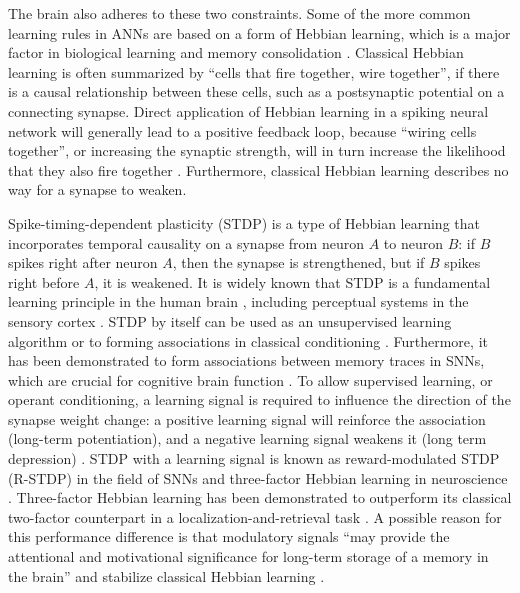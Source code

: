 The brain also adheres to these two constraints.
Some of the more common learning rules in ANNs are based on a form of Hebbian learning, which is a major factor in biological learning and memory consolidation \citep{schuman2017survey}.
Classical Hebbian learning is often summarized by ``cells that fire together, wire together'', if there is a causal relationship between these cells, such as a postsynaptic potential on a connecting synapse.
Direct application of Hebbian learning in a spiking neural network will generally lead to a positive feedback loop, because ``wiring cells together'', or increasing the synaptic strength, will in turn increase the likelihood that they also fire together \citep{zenke2017temporal}.
Furthermore, classical Hebbian learning describes no way for a synapse to weaken.

Spike-timing-dependent plasticity (STDP) \citep{abbott2000synaptic,caporale2008spike} is a type of Hebbian learning that incorporates temporal causality on a synapse from neuron $A$ to neuron $B$: if $B$ spikes right after neuron $A$, then the synapse is strengthened, but if $B$ spikes right before $A$, it is weakened.
It is widely known that STDP is a fundamental learning principle in the human brain \citep{kandel2000principles,caporale2008spike}, including perceptual systems in the sensory cortex \citep{huang2014associative}.
STDP by itself can be used as an unsupervised learning algorithm or to forming associations in classical conditioning \citep{diehl2015unsupervised,kim2018demonstration}.
Furthermore, it has been demonstrated to form associations between memory traces in SNNs, which are crucial for cognitive brain function \citep{pokorny2020stdp}.
To allow supervised learning, or operant conditioning, a learning signal is required to influence the direction of the synapse weight change: a positive learning signal will reinforce the association (long-term potentiation), and a negative learning signal weakens it (long term depression) \citep{lobov2020spatial}.
STDP with a learning signal is known as reward-modulated STDP (R-STDP) \citep{legenstein2008learning} in the field of SNNs and three-factor Hebbian learning in neuroscience \citep{fremaux2016neuromodulated}.
Three-factor Hebbian learning has been demonstrated to outperform its classical two-factor counterpart in a localization-and-retrieval task \citep{porr2007learning}.
A possible reason for this performance difference is that modulatory signals ``may provide the attentional and motivational significance for long-term storage of a memory in the brain'' and stabilize classical Hebbian learning \citep{bailey2000heterosynaptic}.


